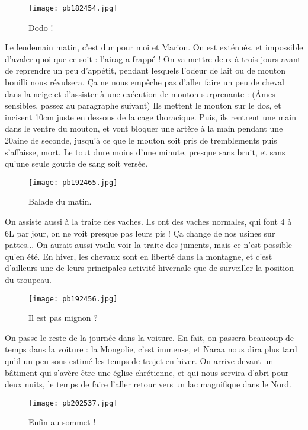 \documentclass{book}
\begin{document}
\begin{figure}[h]
\centering
\texttt{[image: pb182454.jpg]}
\caption*{ Dodo !}
\end{figure}

Le lendemain matin, c'est dur pour moi et Marion. On est exténués, et impossible d'avaler quoi que ce soit : l'airag a frappé ! On va mettre deux à trois jours avant de reprendre un peu d'appétit, pendant lesquels l'odeur de lait ou de mouton bouilli nous révulsera. Ça ne nous empêche pas d'aller faire un peu de cheval dans la neige et d'assister à une exécution de mouton surprenante : (Âmes sensibles, passez au paragraphe suivant) Ils mettent le mouton sur le dos, et incisent 10cm juste en dessous de la cage thoracique. Puis, ils rentrent une main dans le ventre du mouton, et vont bloquer une artère à la main pendant une 20aine de seconde, jusqu'à ce que le mouton soit pris de tremblements puis s'affaisse, mort. Le tout dure moins d'une minute, presque sans bruit, et sans qu'une seule goutte de sang soit versée.


\begin{figure}[h]
\centering
\texttt{[image: pb192465.jpg]}
\caption*{ Balade du matin.}
\end{figure}

On assiste aussi à la traite des vaches. Ils ont des vaches normales, qui font 4 à 6L par jour, on ne voit presque pas leurs pis ! Ça change de nos usines sur pattes... On aurait aussi voulu voir la traite des juments, mais ce n'est possible qu'en été. En hiver, les chevaux sont en liberté dans la montagne, et c'est d'ailleurs une de leurs principales activité hivernale que de surveiller la position du troupeau.


\begin{figure}[h]
\centering
\texttt{[image: pb192456.jpg]}
\caption*{ Il est pas mignon ?}
\end{figure}

On passe le reste de la journée dans la voiture. En fait, on passera beaucoup de temps dans la voiture : la Mongolie, c'est immense, et Naraa nous dira plus tard qu'il un peu sous-estimé les temps de trajet en hiver. On arrive devant un bâtiment qui s'avère être une église chrétienne, et qui nous servira d'abri pour deux nuits, le temps de faire l'aller retour vers un lac magnifique dans le Nord.


\begin{figure}[h]
\centering
\texttt{[image: pb202537.jpg]}
\caption*{ Enfin au sommet !}
\end{figure}
\end{document}
